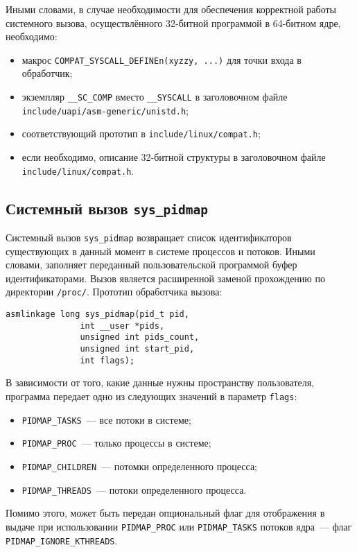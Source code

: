 Иными словами, в случае необходимости для обеспечения корректной работы
системного вызова, осуществлённого 32-битной программой в 64-битном ядре,
необходимо:

\begin{itemize}
\item макрос \texttt{COMPAT\_SYSCALL\_DEFINEn(xyzzy, ...)} для точки входа в
  обработчик;
\item экземпляр \texttt{\_\_SC\_COMP} вместо \texttt{\_\_SYSCALL} в заголовочном
  файле \texttt{include/uapi/asm-generic/unistd.h};
\item соответствующий прототип в \texttt{include/linux/compat.h};
\item если необходимо, описание 32-битной структуры в заголовочном файле
  \texttt{include/linux/compat.h}.
\end{itemize}

\subsection{Системный вызов \texttt{sys\_pidmap}}

Системный вызов \texttt{sys\_pidmap} возвращает список идентификаторов
существующих в данный момент в системе процессов и потоков. Иными словами,
заполняет переданный пользовательской программой буфер идентификаторами. Вызов
является расширенной заменой прохождению по директории \texttt{/proc/}. Прототип
обработчика вызова:

\medskip
\begin{lstlisting}[style=cstyle]
asmlinkage long sys_pidmap(pid_t pid,
			   int __user *pids,
			   unsigned int pids_count,
			   unsigned int start_pid,
			   int flags);
\end{lstlisting}
\medskip

В зависимости от того, какие данные нужны пространству пользователя, программа
передает одно из следующих значений в параметр \texttt{flags}:

\begin{itemize}
\item \texttt{PIDMAP\_TASKS}~--- все потоки в системе;
\item \texttt{PIDMAP\_PROC}~--- только процессы в системе;
\item \texttt{PIDMAP\_CHILDREN}~--- потомки определенного процесса;
\item \texttt{PIDMAP\_THREADS}~--- потоки определенного процесса.
\end{itemize}

Помимо этого, может быть передан опциональный флаг для отображения в выдаче
при использовании \texttt{PIDMAP\_PROC} или \texttt{PIDMAP\_TASKS} потоков
ядра~--- флаг \texttt{PIDMAP\_IGNORE\_KTHREADS}.


